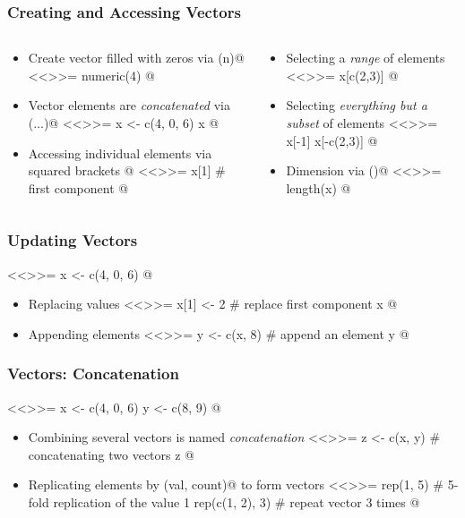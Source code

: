 \documentclass[%
  final,
  11pt, 
  show notes, %
  t, %
  fleqn, %
]{beamer}
\begin{document}
\begin{frame}[fragile]
  \frametitle{Creating and Accessing Vectors}
\begin{columns}[T]
\begin{column}{.45\textwidth}\begin{itemize}
\item Create vector filled with zeros via \verb@numeric(n)@
<<>>=
numeric(4)
@
\item Vector elements are \emph{concatenated} via \verb@c(...)@
<<>>=
x <- c(4, 0, 6)
x
@
\item Accessing individual elements via squared brackets \verb@[]@
<<>>=
x[1] # first component
@
\end{itemize}
\end{column}
\begin{column}{.45\textwidth}
\begin{itemize}
\item Selecting a \emph{range} of elements
<<>>=
x[c(2,3)]
@
\item Selecting \emph{everything but a subset} of elements
<<>>=
x[-1]
x[-c(2,3)]
@
\item Dimension via \verb@length()@
<<>>=
length(x)
@
\end{itemize}
\end{column}
\end{columns}
\end{frame}

\begin{frame}[fragile]
\frametitle{Updating Vectors}
<<>>=
x <- c(4, 0, 6)
@
\begin{itemize}
\item Replacing values
<<>>=
x[1] <- 2 # replace first component
x
@
\item Appending elements
<<>>=
y <- c(x, 8) # append an element
y
@
\end{itemize}
\end{frame}

\begin{frame}[fragile]
  \frametitle{Vectors: Concatenation}
<<>>=
x <- c(4, 0, 6)
y <- c(8, 9)
@
\begin{itemize}
\item Combining several vectors is named \emph{concatenation}
<<>>=
z <- c(x, y) # concatenating two vectors
z
@
\item Replicating elements by \verb@rep(val, count)@ to form vectors
<<>>=
rep(1, 5) # 5-fold replication of the value 1
rep(c(1, 2), 3) # repeat vector 3 times
@
\end{itemize}
\end{frame}
\end{document}
